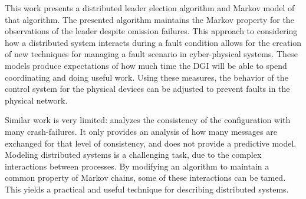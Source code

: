 This work presents a distributed leader election algorithm and Markov model of that algorithm.
The presented algorithm maintains the Markov property for the observations of the leader despite omission failures.
This approach to considering how a distributed system interacts during a fault condition allows for the creation of new techniques for managing a fault scenario in cyber-physical systems.
These models produce expectations of how much time the DGI will be able to spend coordinating and doing useful work.
Using these measures, the behavior of the control system for the physical devices can be adjusted to prevent faults in the physical network.

Similar work is very limited: \cite{LEADERELECTIONEVAL} analyzes the consistency of the configuration with many crash-failures.
It only provides an analysis of how many messages are exchanged for that level of consistency, and does not provide a predictive model.
Modeling distributed systems is a challenging task, due to the complex interactions between processes.
By modifying an algorithm to maintain a common property of Markov chains, some of these interactions can be tamed.
This yields a practical and useful technique for describing distributed systems.
